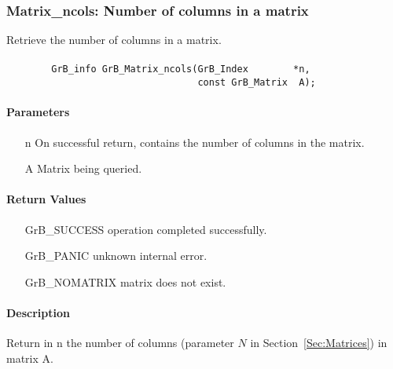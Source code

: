 \subsubsection{{\sf Matrix\_ncols}: Number of columns in a matrix}

Retrieve the number of columns in a matrix.

\paragraph{\syntax}

\begin{verbatim}
        GrB_info GrB_Matrix_ncols(GrB_Index        *n,
                                  const GrB_Matrix  A);
\end{verbatim}

\paragraph{Parameters}

\begin{itemize}[leftmargin=1.1in]
    \item[{\sf n}] On successful return, contains the number of columns in the matrix.
    \item[{\sf A}] Matrix being queried.
\end{itemize}

\paragraph{Return Values}

\begin{itemize}[leftmargin=2.1in]
\item[{\sf GrB\_SUCCESS}]   operation completed successfully.
\item[{\sf GrB\_PANIC}]     unknown internal error.
\item[{\sf GrB\_NOMATRIX}]  matrix does not exist.
\end{itemize}

\paragraph{Description}

Return in {\sf n} the number of columns (parameter $N$ in Section~\ref{Sec:Matrices}) in matrix {\sf A}.


